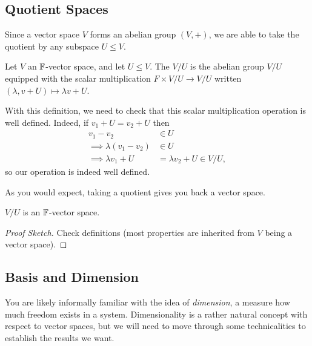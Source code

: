 \documentclass[a4paper]{scrartcl}
\begin{document}
\subsection{Quotient Spaces}

Since a vector space $V$ forms an abelian group $(V, +)$, we are able to take the quotient by any subspace $U \leq V$. 

\begin{definition}
    Let $V$ an $\mathbb{F}$-vector space, and let $U \leq V$. The  $V/U$ is the abelian group $V/U$ equipped with the scalar multiplication $F \times V/U \rightarrow V/U$ written $(\lambda, v + U) \mapsto \lambda v + U$.
\end{definition}

With this definition, we need to check that this scalar multiplication operation 
is well defined. Indeed, if $v_1 + U = v_2 + U$ then
\begin{align*}
    v_1 - v_2 &\in U \\
\implies \lambda(v_1 - v_2) &\in U \\
\implies \lambda v_1 + U &= \lambda v_2 + U \in V/U,
\end{align*}
so our operation is indeed well defined.

As you would expect, taking a quotient gives you back a vector space.

\begin{proposition}
    $V/U$ is an $\mathbb{F}$-vector space.
\end{proposition}
\begin{proof}[Proof Sketch]
    Check definitions (most properties are inherited from $V$ being a vector space).
\end{proof}


\subsection{Basis and Dimension}

You are likely informally familiar with the idea of \emph{dimension}, a measure how much freedom exists in a system. Dimensionality is a rather natural concept with respect to vector spaces, but we will need to move through some technicalities to establish the results we want.
\end{document}
